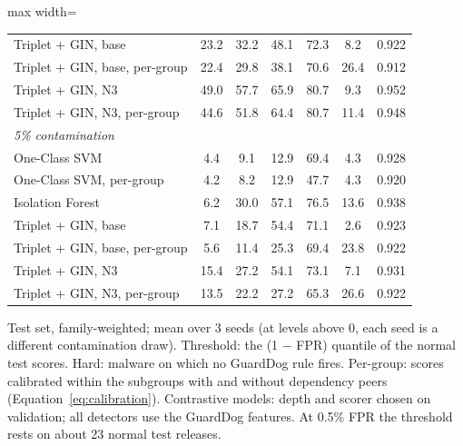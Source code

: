 \begin{table}[htbp]
\begin{adjustbox}{max width=\linewidth}
\begin{tabular}{lcccccc}
Triplet + GIN, base & 23.2 & 32.2 & 48.1 & 72.3 & 8.2 & 0.922 \\
Triplet + GIN, base, per-group & 22.4 & 29.8 & 38.1 & 70.6 & 26.4 & 0.912 \\
Triplet + GIN, N3 & 49.0 & 57.7 & 65.9 & 80.7 & 9.3 & 0.952 \\
Triplet + GIN, N3, per-group & 44.6 & 51.8 & 64.4 & 80.7 & 11.4 & 0.948 \\
\midrule
\multicolumn{7}{l}{\textit{5\% contamination}} \\
One-Class SVM & 4.4 & 9.1 & 12.9 & 69.4 & 4.3 & 0.928 \\
One-Class SVM, per-group & 4.2 & 8.2 & 12.9 & 47.7 & 4.3 & 0.920 \\
Isolation Forest & 6.2 & 30.0 & 57.1 & 76.5 & 13.6 & 0.938 \\
Triplet + GIN, base & 7.1 & 18.7 & 54.4 & 71.1 & 2.6 & 0.923 \\
Triplet + GIN, base, per-group & 5.6 & 11.4 & 25.3 & 69.4 & 23.8 & 0.922 \\
Triplet + GIN, N3 & 15.4 & 27.2 & 54.1 & 73.1 & 7.1 & 0.931 \\
Triplet + GIN, N3, per-group & 13.5 & 22.2 & 27.2 & 65.3 & 26.6 & 0.922 \\
\bottomrule
\end{tabular}
\end{adjustbox}
\par\smallskip
\parbox{0.95\linewidth}{\footnotesize Test set, family-weighted; mean over 3 seeds (at levels above 0, each seed is a different contamination draw). Threshold: the (1 $-$ FPR) quantile of the normal test scores. Hard: malware on which no GuardDog rule fires. Per-group: scores calibrated within the subgroups with and without dependency peers (Equation~\ref{eq:calibration}). Contrastive models: depth and scorer chosen on validation; all detectors use the GuardDog features. At 0.5\% FPR the threshold rests on about 23 normal test releases.}
\end{table}
